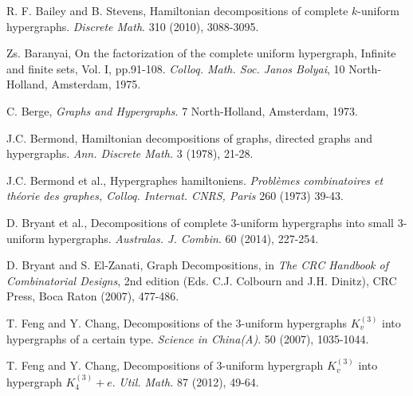 
\begin{thebibliography}{99}

  R. F. Bailey and B. Stevens,
  Hamiltonian decompositions of complete $k$-uniform hypergraphs.
  {\em Discrete Math}. 310 (2010), 3088-3095.

  Zs. Baranyai,
  On the factorization of the complete uniform hypergraph, Infinite and finite
  sets, Vol. I, pp.91-108.
  {\em Colloq. Math. Soc. Janos Bolyai}, 10 North-Holland, Amsterdam, 1975.

  C. Berge,
  {\em Graphs and Hypergraphs}.
  7 North-Holland, Amsterdam, 1973.

  J.C. Bermond,
  Hamiltonian decompositions of graphs, directed graphs and
  hypergraphs.
  {\em Ann. Discrete Math.} 3 (1978), 21-28.

  J.C. Bermond et al.,
  Hypergraphes hamiltoniens.
  {\em Probl\`{e}mes combinatoires et th\'{e}orie des graphes, Colloq.
  Internat. CNRS, Paris} 260 (1973) 39-43.

  D. Bryant et al.,
  Decompositions of complete 3-uniform hypergraphs into small 3-uniform hypergraphs.
  {\em Australas. J. Combin}. 60 (2014), 227-254.

  D. Bryant and S. El-Zanati,
  Graph Decompositions,
  in {\em The CRC Handbook of Combinatorial Designs}, 2nd edition
  (Eds. C.J. Colbourn and J.H. Dinitz),
  CRC Press, Boca Raton (2007), 477-486.

  

  T. Feng and Y. Chang,
  Decompositions of the 3-uniform hypergraphs $K_v^{(3)}$ into hypergraphs of a
  certain type.
  {\em Science in China(A)}. 50 (2007), 1035-1044.

  T. Feng and Y. Chang,
  Decompositions of 3-uniform hypergraph $K_v^{(3)}$ into hypergraph $K_4^{(3)}
  + e$.
  {\em Util. Math.} 87 (2012), 49-64.



\end{thebibliography}
